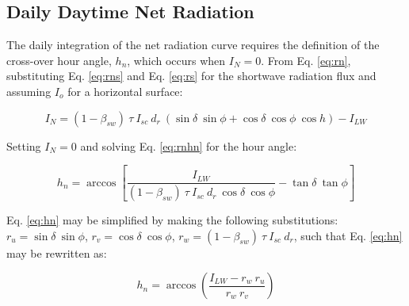 \subsection{Daily Daytime Net Radiation}
\label{sec:drn}
The daily integration of the net radiation curve requires the definition of the cross-over hour angle, $h_n$, which occurs when $I_N = 0$. 
From Eq. \ref{eq:rn}, substituting Eq. \ref{eq:rns} and Eq. \ref{eq:rs} for the shortwave radiation flux and assuming $I_o$ for a horizontal surface:

\begin{equation}
\label{eq:rnhn}
	I_{N} = \left(1-\beta_{sw}\right)\: \tau\: I_{sc}\: d_r\: \left(
	        \sin\delta\: \sin\phi + 
	        \cos\delta\: \cos\phi\: \cos h
	        \right) - I_{LW}
\end{equation}

\noindent Setting $I_N = 0$ and solving Eq. \ref{eq:rnhn} for the hour angle:

\begin{equation}
\label{eq:hn}
	h_n = \arccos \left[ 
	        \frac{I_{LW}}{\left(1-\beta_{sw}\right)\:\tau\: I_{sc}\: d_r\: 
	        \cos\delta\: \cos\phi} - 
	        \tan\delta\: \tan\phi
	        \right]
\end{equation}

\noindent Eq. \ref{eq:hn} may be simplified by making the following substitutions: $r_u = \sin\delta\:\sin\phi$, $r_v = \cos\delta\:\cos\phi$, $r_w = \left(1-\beta_{sw}\right)\:\tau\: I_{sc}\: d_r$, such that Eq. \ref{eq:hn} may be rewritten as:

\begin{equation}
\label{eq:hns}
	h_n = \arccos \left( 
	        \frac{I_{LW} - r_w\: r_u}{r_w\: r_v} 
	        \right)
\end{equation}

